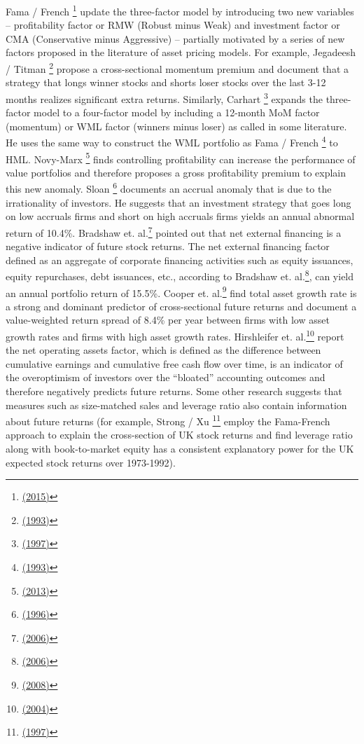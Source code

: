 \documentclass[a4paper,12pt]{article}
\begin{document}
Fama / French \footnote{\protect\hyperlink{ref-RN17}{(2015)}} update the three-factor model by introducing two new variables -- profitability factor or RMW (Robust minus Weak) and investment factor or CMA (Conservative minus Aggressive) -- partially motivated by a series of new factors proposed in the literature of asset pricing models. For example, Jegadeesh / Titman \footnote{\protect\hyperlink{ref-RN73}{(1993)}} propose a cross-sectional momentum premium and document that a strategy that longs winner stocks and shorts loser stocks over the last 3-12 months realizes significant extra returns. Similarly, Carhart \footnote{\protect\hyperlink{ref-RN81}{(1997)}} expands the three-factor model to a four-factor model by including a 12-month MoM factor (momentum) or WML factor (winners minus loser) as called in some literature. He uses the same way to construct the WML portfolio as Fama / French \footnote{\protect\hyperlink{ref-RN66}{(1993)}} to HML. Novy-Marx \footnote{\protect\hyperlink{ref-RN23}{(2013)}} finds controlling profitability can increase the performance of value portfolios and therefore proposes a gross profitability premium to explain this new anomaly. Sloan \footnote{\protect\hyperlink{ref-RN82}{(1996)}} documents an accrual anomaly that is due to the irrationality of investors. He suggests that an investment strategy that goes long on low accruals firms and short on high accruals firms yields an annual abnormal return of 10.4\%. Bradshaw et. al.\footnote{\protect\hyperlink{ref-RN83}{(2006)}} pointed out that net external financing is a negative indicator of future stock returns. The net external financing factor defined as an aggregate of corporate financing activities such as equity issuances, equity repurchases, debt issuances, etc., according to Bradshaw et. al.\footnote{\protect\hyperlink{ref-RN83}{(2006)}}, can yield an annual portfolio return of 15.5\%. Cooper et. al.\footnote{\protect\hyperlink{ref-RN75}{(2008)}} find total asset growth rate is a strong and dominant predictor of cross-sectional future returns and document a value-weighted return spread of 8.4\% per year between firms with low asset growth rates and firms with high asset growth rates. Hirshleifer et. al.\footnote{\protect\hyperlink{ref-RN84}{(2004)}} report the net operating assets factor, which is defined as the difference between cumulative earnings and cumulative free cash flow over time, is an indicator of the overoptimism of investors over the ``bloated'' accounting outcomes and therefore negatively predicts future returns. Some other research suggests that measures such as size-matched sales and leverage ratio also contain information about future returns (for example, Strong / Xu \footnote{\protect\hyperlink{ref-RN68}{(1997)}} employ the Fama-French approach to explain the cross-section of UK stock returns and find leverage ratio along with book-to-market equity has a consistent explanatory power for the UK expected stock returns over 1973-1992).
\end{document}
